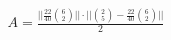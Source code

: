 \documentclass[preview]{standalone}
\begin{document}
\begin{align*}
A=\frac{||\frac{22}{40}\binom{6}{2}|| \cdot ||\binom{2}{5}-\frac{22}{40}\binom{6}{2}||}{2}
\end{align*}
\end{document}
